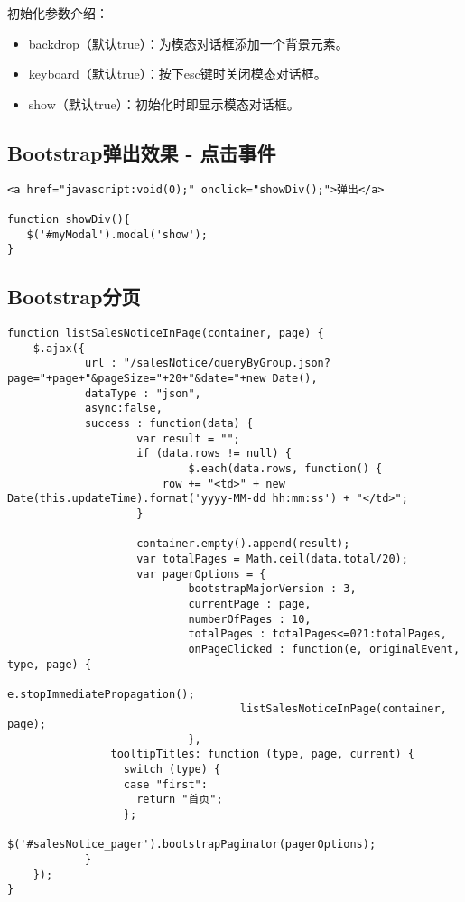 \documentclass[11pt]{article}
\begin{document}
初始化参数介绍：
\begin{itemize}
\item backdrop（默认true）：为模态对话框添加一个背景元素。
\item keyboard（默认true）：按下esc键时关闭模态对话框。
\item show（默认true）：初始化时即显示模态对话框。
\end{itemize}

\subsection*{Bootstrap弹出效果 - 点击事件}
\label{sec-2-3}

\begin{verbatim}
<a href="javascript:void(0);" onclick="showDiv();">弹出</a>

function showDiv(){
   $('#myModal').modal('show');
}
\end{verbatim}


\subsection*{Bootstrap分页}
\label{sec-2-4}
\begin{verbatim}
function listSalesNoticeInPage(container, page) {
    $.ajax({
            url : "/salesNotice/queryByGroup.json?page="+page+"&pageSize="+20+"&date="+new Date(),
            dataType : "json",
            async:false,
            success : function(data) {
                    var result = "";
                    if (data.rows != null) {
                            $.each(data.rows, function() {
                        row += "<td>" + new Date(this.updateTime).format('yyyy-MM-dd hh:mm:ss') + "</td>";
                    }

                    container.empty().append(result);
                    var totalPages = Math.ceil(data.total/20);
                    var pagerOptions = {
                            bootstrapMajorVersion : 3,
                            currentPage : page,
                            numberOfPages : 10,
                            totalPages : totalPages<=0?1:totalPages,
                            onPageClicked : function(e, originalEvent, type, page) {
                                            e.stopImmediatePropagation();
                                    listSalesNoticeInPage(container, page);
                            },
                tooltipTitles: function (type, page, current) {
                  switch (type) {
                  case "first":
                    return "首页";
                  };
                  $('#salesNotice_pager').bootstrapPaginator(pagerOptions);
            }
    });
}
\end{verbatim}
\end{document}
